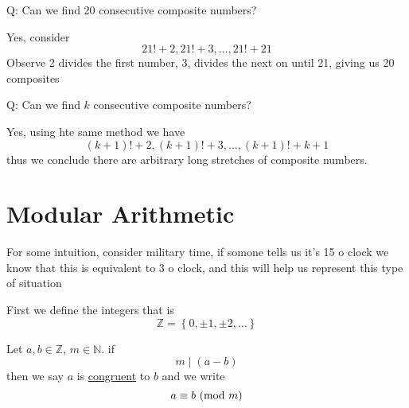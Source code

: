 \documentclass[11pt]{book}
\begin{document}
Q: Can we find 20 consecutive composite numbers?

Yes, consider 
\[
21! + 2, 21!  + 3, \ldots , 21!  + 21
\]
Observe 2 divides the first number, 3, divides the next on until 21, giving us 20 composites

Q: Can we find $k$ consecutive composite numbers?

Yes, using hte same method we have 
\[
    \left( k + 1 \right)!  + 2, \left( k + 1 \right) !  + 3, \ldots , \left( k + 1 \right) !  + k + 1
\]
thus we conclude there are arbitrary long stretches of composite numbers.

\section{Modular Arithmetic}%
\label{sec:modular_arithmetic}

For some intuition, consider military time, if somone tells us it's 15 o clock we know that this is equivalent to 3 o clock, and this will help us represent this type of situation

First we define the integers that is 
\[
\mathbb{Z} = \left\{ 0, \pm 1, \pm 2, \ldots  \right\} 
\]

\begin{defn}[Congruence]\label{defn:congruence}
    Let $a, b \in \mathbb{Z} $,  $m \in \mathbb{N} $.  if 
    \[
        m \mid \left( a - b \right) 
    \]
    then we say $a$ is \underline{congruent} to $b$ and we write
    \[
    a \equiv b \ (\mathrm{mod}\ m)
    \]
\end{defn}
\end{document}
